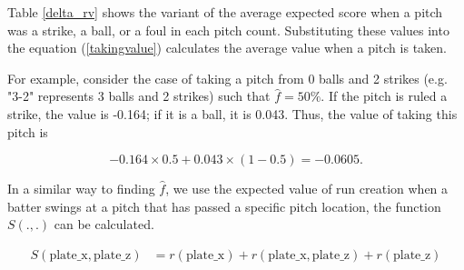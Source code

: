 \documentclass[dvipdfmx, 12pt]{jsarticle}
\begin{document}
Table \ref{delta_rv} shows the variant of the average expected score when a pitch was a strike, a ball, or a foul in each pitch count. Substituting these values into the equation (\ref{takingvalue}) calculates the average value when a pitch is taken.

For example, consider the case of taking a pitch from 0 balls and 2 strikes (e.g. "3-2" represents 3 balls and 2 strikes) such that $\hat{f} = 50\%$. If the pitch is ruled a strike, the value is -0.164; if it is a ball, it is 0.043. Thus, the value of taking this pitch is

\[-0.164 \times 0.5 + 0.043 \times (1 - 0.5) = -0.0605. \]

\begin{table}[ht]
  \centering
  \caption{$\Delta$ Run Expectation at Each Pitch Count}
  \label{delta_rv}
\end{table}

In a similar way to finding $\hat{f}$, we use the expected value of run creation when a batter swings at a pitch that has passed a specific pitch location, the function $S(. ,.) $ can be calculated.

\begin{align}
  S(\text{plate\_x}, \text{plate\_z}) & = r(\text{plate\_x}) + r(\text{plate\_x}, \text{plate\_z}) + r(\text{plate\_z}) \label{spline_swing}
\end{align}
\end{document}
